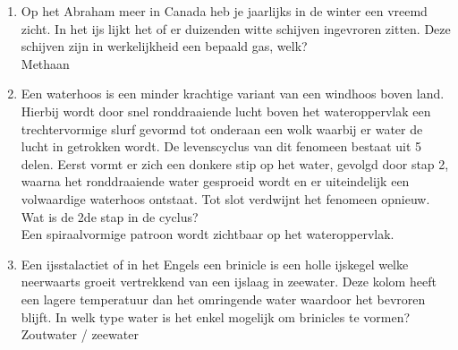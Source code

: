 \begin{enumerate}
\newpage
\item{Op het Abraham meer in Canada heb je jaarlijks in de winter een vreemd zicht. In het ijs lijkt het of er duizenden witte schijven ingevroren zitten. Deze schijven zijn in werkelijkheid een bepaald gas, welk?\\ Methaan}
\item{Een waterhoos is een minder krachtige variant van een windhoos boven land. Hierbij wordt door snel ronddraaiende lucht boven het wateroppervlak een trechtervormige slurf gevormd tot onderaan een wolk waarbij er water de lucht in getrokken wordt. De levenscyclus van dit fenomeen bestaat uit 5 delen. Eerst vormt er zich een donkere stip op het water, gevolgd door stap 2, waarna het ronddraaiende water gesproeid wordt en er uiteindelijk een volwaardige waterhoos ontstaat. Tot slot verdwijnt het fenomeen opnieuw. Wat is de 2de stap in de cyclus? \\ Een spiraalvormige patroon wordt zichtbaar op het wateroppervlak.
}
\item{Een ijsstalactiet of in het Engels een brinicle is een holle ijskegel welke neerwaarts groeit vertrekkend van een ijslaag in zeewater. Deze kolom heeft een lagere temperatuur dan het omringende water waardoor het bevroren blijft. In welk type water is het enkel mogelijk om brinicles te vormen? \\ Zoutwater / zeewater}
\end{enumerate}